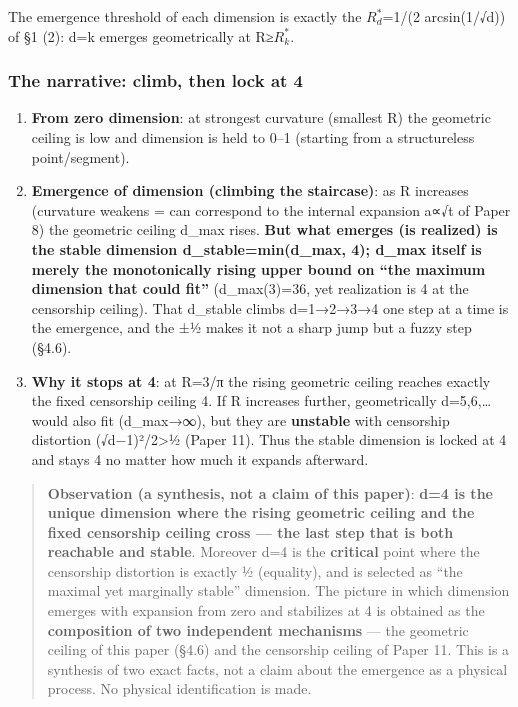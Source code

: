 \documentclass[
]{ltjsarticle}
\begin{document}
The emergence threshold of each dimension is exactly the
\(R^{*}_{d}\)=1/(2 arcsin(1/√d)) of §1 (2): d=k emerges geometrically at
R≥\(R^{*}_{k}\).

\subsubsection{The narrative: climb, then lock at
4}\label{the-narrative-climb-then-lock-at-4}

\begin{enumerate}
\def\labelenumi{(\roman{enumi})}
\item
  \textbf{From zero dimension}: at strongest curvature (smallest R) the
  geometric ceiling is low and dimension is held to 0--1 (starting from
  a structureless point/segment).
\item
  \textbf{Emergence of dimension (climbing the staircase)}: as R
  increases (curvature weakens = can correspond to the internal
  expansion a∝√t of Paper 8) the geometric ceiling d\_max rises.
  \textbf{But what emerges (is realized) is the stable dimension
  d\_stable=min(d\_max, 4); d\_max itself is merely the monotonically
  rising upper bound on ``the maximum dimension that could fit''}
  (d\_max(3)=36, yet realization is 4 at the censorship ceiling). That
  d\_stable climbs d=1→2→3→4 one step at a time is the emergence, and
  the ±½ makes it not a sharp jump but a fuzzy step (§4.6).
\item
  \textbf{Why it stops at 4}: at R=3/π the rising geometric ceiling
  reaches exactly the fixed censorship ceiling 4. If R increases
  further, geometrically d=5,6,\ldots{} would also fit (d\_max→∞), but
  they are \textbf{unstable} with censorship distortion
  (√d−1)²/2\textgreater½ (Paper 11). Thus the stable dimension is locked
  at 4 and stays 4 no matter how much it expands afterward.
\end{enumerate}

\begin{quote}
\textbf{Observation (a synthesis, not a claim of this paper)}:
\textbf{d=4 is the unique dimension where the rising geometric ceiling
and the fixed censorship ceiling cross --- the last step that is both
reachable and stable}. Moreover d=4 is the \textbf{critical} point where
the censorship distortion is exactly ½ (equality), and is selected as
``the maximal yet marginally stable'' dimension. The picture in which
dimension emerges with expansion from zero and stabilizes at 4 is
obtained as the \textbf{composition of two independent mechanisms} ---
the geometric ceiling of this paper (§4.6) and the censorship ceiling of
Paper 11. This is a synthesis of two exact facts, not a claim about the
emergence as a physical process. No physical identification is made.
\end{quote}
\end{document}
